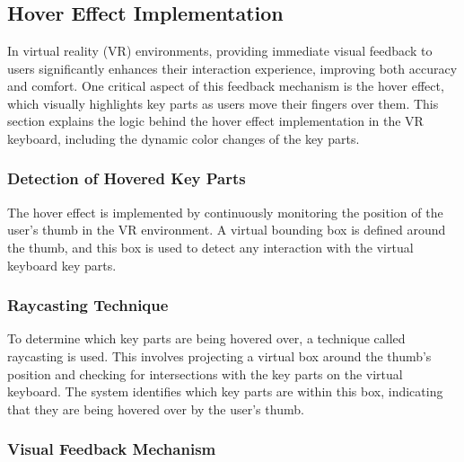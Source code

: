 \noindent
\\\\                
\noindent
\\\\  \noindent
\\\\  \noindent
\\\\  \noindent


\subsection{Hover Effect Implementation}

In virtual reality (VR) environments, providing immediate visual feedback to users significantly enhances their interaction experience, improving both accuracy and comfort. One critical aspect of this feedback mechanism is the hover effect, which visually highlights key parts as users move their fingers over them. This section explains the logic behind the hover effect implementation in the VR keyboard, including the dynamic color changes of the key parts.

\subsubsection{Detection of Hovered Key Parts}

The hover effect is implemented by continuously monitoring the position of the user's thumb in the VR environment. A virtual bounding box is defined around the thumb, and this box is used to detect any interaction with the virtual keyboard key parts.

\subsubsection{Raycasting Technique}

To determine which key parts are being hovered over, a technique called raycasting is used. This involves projecting a virtual box around the thumb's position and checking for intersections with the key parts on the virtual keyboard. The system identifies which key parts are within this box, indicating that they are being hovered over by the user's thumb.

\subsubsection{Visual Feedback Mechanism}

